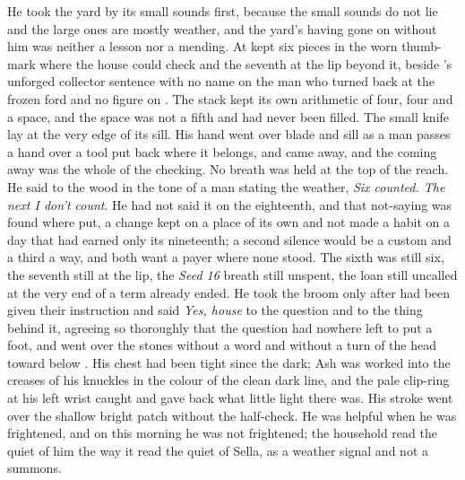 He took the yard by its small sounds first, because the small sounds do not lie and the large ones are mostly weather, and the yard's having gone on without him was neither a lesson nor a mending. At   kept six pieces in the worn thumb-mark where the house could check and the seventh at the lip beyond it, beside 's unforged collector sentence with no name on the man who turned back at the frozen ford and no figure on . The stack kept its own arithmetic of four, four and a space, and the space was not a fifth and had never been filled. The small knife lay at the very edge of its sill. His hand went over blade and sill as a man passes a hand over a tool put back where it belongs, and came away, and the coming away was the whole of the checking. No breath was held at the top of the reach. He said to the wood in the tone of a man stating the weather, \emph{Six counted. The next I don't count}. He had not said it on the eighteenth, and that not-saying was found where put, a change kept on a place of its own and not made a habit on a day that had earned only its nineteenth; a second silence would be a custom and a third a way, and both want a payer where none stood. The sixth was still six, the seventh still at the lip, the \emph{Seed 16} breath still unspent, the loan still uncalled at the very end of a term already ended. He took the broom only after  had been given their instruction and said \emph{Yes, house} to the question and to the thing behind it, agreeing so thoroughly that the question had nowhere left to put a foot, and went over the stones without a word and without a turn of the head toward  below . His chest had been tight since the dark; Ash was worked into the creases of his knuckles in the colour of the clean dark line, and the pale clip-ring at his left wrist caught and gave back what little light there was. His stroke went over the shallow bright patch without the half-check. He was helpful when he was frightened, and on this morning he was not frightened; the household read the quiet of him the way it read the quiet of Sella, as a weather signal and not a summons.

